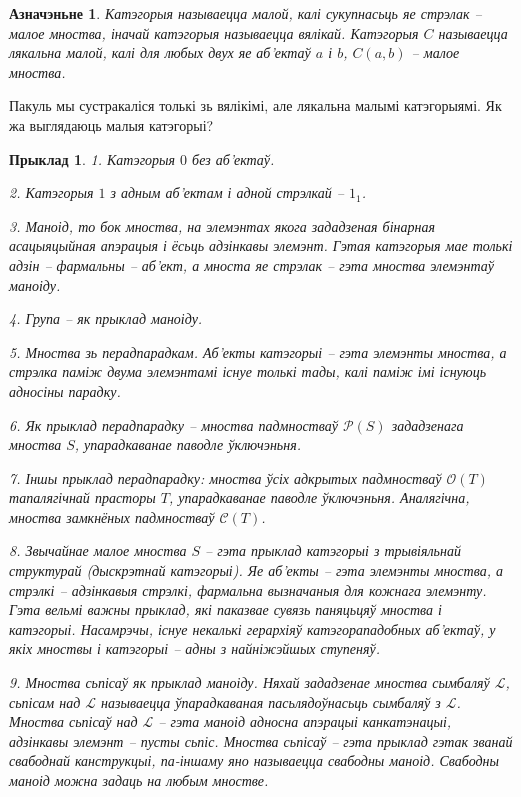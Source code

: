 \documentclass[a4paper,12pt]{book}
\newtheorem{example}{Прыклад}[section]
\newtheorem{definition}{Азначэньне}[section]
\begin{document}
\begin{definition}
  Катэгорыя называецца малой, калі сукупнасьць яе стрэлак -- малое
  мноства, іначай катэгорыя называецца вялікай. Катэгорыя $C$ называецца
  лякальна малой, калі для любых двух яе аб'ектаў $a$ і $b$, $C(a, b)$
  -- малое мноства.
\end{definition}

Пакуль мы сустракаліся толькі зь вялікімі, але лякальна малымі катэгорыямі. Як жа выглядаюць
малыя катэгорыі?

\begin{example}
  1. Катэгорыя $0$ без аб'ектаў.

  2. Катэгорыя $1$ з адным аб'ектам і адной стрэлкай -- $1_1$.

  3. Маноід, то бок мноства, на элемэнтах якога зададзеная бінарная
  асацыяцыйная апэрацыя і ёсьць адзінкавы элемэнт. Гэтая катэгорыя мае
  толькі адзін -- фармальны -- аб'ект, а мноста яе стрэлак -- гэта
  мноства элемэнтаў маноіду.

  4. Група -- як прыклад маноіду.

  5. Мноства зь перадпарадкам. Аб'екты катэгорыі -- гэта
  элемэнты мноства, а стрэлка паміж двума элемэнтамі існуе толькі
  тады, калі паміж імі існуюць адносіны парадку.

  6. Як прыклад перадпарадку -- мноства падмностваў $\mathcal{P}(S)$
  зададзенага
  мноства $S$, упарадкаванае паводле ўключэньня.

  7. Іншы прыклад перадпарадку: мноства ўсіх адкрытых падмностваў
  $\mathcal{O}(T)$ тапалягічнай прасторы $T$, упарадкаванае паводле
  ўключэньня. Аналягічна, мноства замкнёных падмностваў
  $\mathcal{C}(T)$.

  8. Звычайнае малое мноства $S$ -- гэта прыклад катэгорыі з трывіяльнай
  структурай (дыскрэтнай катэгорыі). Яе аб'екты -- гэта элемэнты
  мноства, а стрэлкі -- адзінкавыя стрэлкі, фармальна вызначаныя для
  кожнага элемэнту. Гэта вельмі важны прыклад, які паказвае сувязь
  паняцьцяў мноства і катэгорыі. Насамрэчы, існуе некалькі герархіяў
  катэгорападобных аб'ектаў, у якіх мноствы і катэгорыі -- адны з
  найніжэйшых ступеняў.

  9. Мноства сьпісаў як прыклад маноіду. Няхай зададзенае мноства
  сымбаляў
  $\mathcal{L}$, сьпісам над $\mathcal{L}$ называецца ўпарадкаваная
  пасьлядоўнасьць сымбаляў з $\mathcal{L}$. Мноства сьпісаў над
  $\mathcal{L}$ -- гэта
  маноід адносна апэрацыі канкатэнацыі, адзінкавы элемэнт -- пусты
  сьпіс. Мноства сьпісаў -- гэта прыклад гэтак званай свабоднай
  канструкцыі, па-іншаму яно называецца свабодны маноід. Свабодны
  маноід можна задаць на любым мностве.
\end{example}
\end{document}
